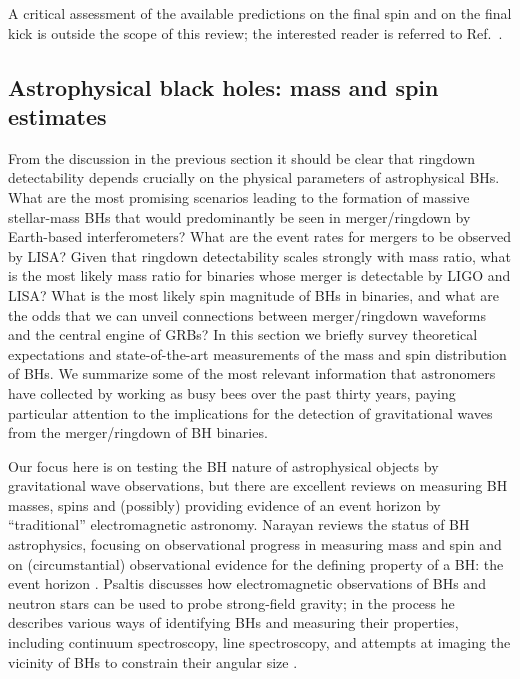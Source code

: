 \documentclass[]{iopart}
\begin{document}
A critical assessment of the available predictions on the final spin and on
the final kick is outside the scope of this review; the interested reader is
referred to Ref.~\cite{Kesden}.

\subsection{\label{sec:massspin}Astrophysical black holes: mass and spin
  estimates}

From the discussion in the previous section it should be clear that ringdown
detectability depends crucially on the physical parameters of astrophysical
BHs.  What are the most promising scenarios leading to the formation of
massive stellar-mass BHs that would predominantly be seen in merger/ringdown
by Earth-based interferometers? What are the event rates for mergers to be
observed by LISA?  Given that ringdown detectability scales strongly with mass
ratio, what is the most likely mass ratio for binaries whose merger is
detectable by LIGO and LISA?  What is the most likely spin magnitude of BHs in
binaries, and what are the odds that we can unveil connections between
merger/ringdown waveforms and the central engine of GRBs? In this section we
briefly survey theoretical expectations and state-of-the-art measurements of
the mass and spin distribution of BHs.  We summarize some of the most relevant
information that astronomers have collected by working as busy bees over the
past thirty years,
paying particular attention to the implications for the detection of
gravitational waves from the merger/ringdown of BH binaries.

Our focus here is on testing the BH nature of astrophysical objects by
gravitational wave observations, but there are excellent reviews on measuring
BH masses, spins and (possibly) providing evidence of an event horizon by
``traditional'' electromagnetic astronomy. Narayan reviews the status of BH
astrophysics, focusing on observational progress in measuring mass and spin
and on (circumstantial) observational evidence for the defining property of a
BH: the event horizon \cite{Narayan:2005ie}. Psaltis discusses how
electromagnetic observations of BHs and neutron stars can be used to probe
strong-field gravity; in the process he describes various ways of identifying
BHs and measuring their properties, including continuum spectroscopy, line
spectroscopy, and attempts at imaging the vicinity of BHs to constrain their
angular size \cite{Psaltis:2008bb}.
\end{document}
